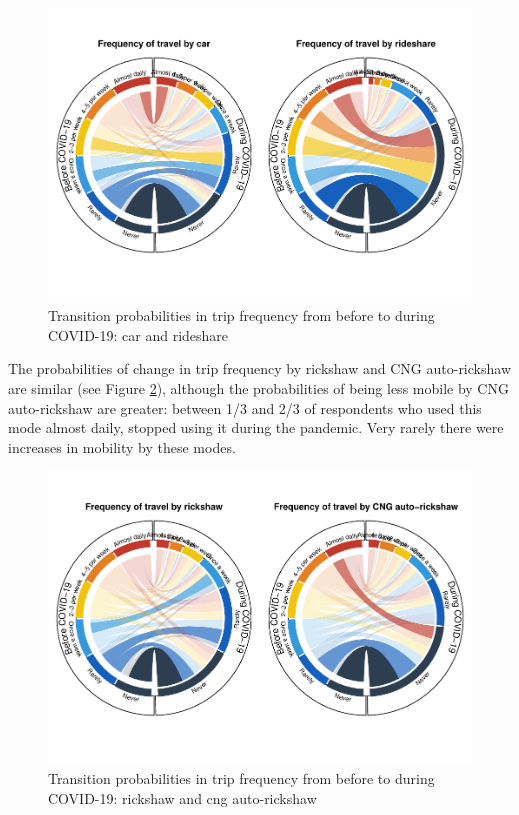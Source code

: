 \documentclass[]{elsarticle} %
\begin{document}
\begin{figure}
\centering
\includegraphics{Frequency-of-Travel-by-Mode-COVID-19-Bangladesh_files/figure-latex/circular-plots-transition-probabilities-1-1.pdf}
\caption{\label{fig:circular-plot-1}Transition probabilities in trip
frequency from before to during COVID-19: car and rideshare}
\end{figure}

The probabilities of change in trip frequency by rickshaw and CNG
auto-rickshaw are similar (see Figure \ref{fig:circular-plot-2}),
although the probabilities of being less mobile by CNG auto-rickshaw are
greater: between 1/3 and 2/3 of respondents who used this mode almost
daily, stopped using it during the pandemic. Very rarely there were
increases in mobility by these modes.

\begin{figure}
\centering
\includegraphics{Frequency-of-Travel-by-Mode-COVID-19-Bangladesh_files/figure-latex/circular-plots-transition-probabilities-2-1.pdf}
\caption{\label{fig:circular-plot-2}Transition probabilities in trip
frequency from before to during COVID-19: rickshaw and cng
auto-rickshaw}
\end{figure}
\end{document}
